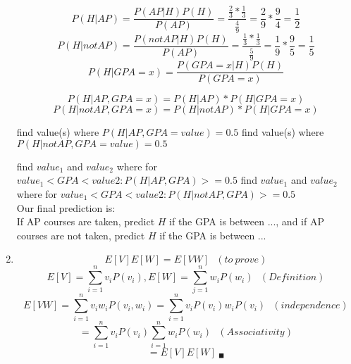 \documentclass{article}
\begin{document}
\begin{enumerate}
            $$ P(H | AP) = \frac{P(AP | H) P(H)}{P(AP)} =
                \frac{\frac{2}{3} * \frac{1}{3}}{\frac{4}{9}} = \frac{2}{9} * \frac{9}{4} = \frac{1}{2}$$
            $$ P(H | not AP) = \frac{P(not AP | H) P(H)}{P(AP)} =
            \frac{\frac{1}{3} * \frac{1}{3}}{\frac{5}{9}} = \frac{1}{9} * \frac{9}{5} = \frac{1}{5}$$
            $$ P(H | GPA = x) = \frac{P(GPA = x | H) P(H) }{P(GPA = x)} $$

            $$ P(H | AP, GPA = x) = P(H | AP) * P(H | GPA = x) $$
            $$ P(H | not AP, GPA = x) = P(H | not AP) * P(H | GPA = x) $$

            find value(s) where $P(H | AP, GPA = value) = 0.5 $
            find value(s) where $P(H | not AP, GPA = value) = 0.5 $

            find $value_1$ and $value_2$ where for $value_1 < GPA < value 2: P(H | AP, GPA) >= 0.5 $
            find $value_1$ and $value_2$ where for $value_1 < GPA < value 2: P(H | not AP, GPA) >= 0.5 $  \\
            Our final prediction is: \\
            If AP courses are taken, predict $H$ if the GPA is between ..., and
            if AP courses are not taken, predict $H$ if the GPA is between ... \\
        \item
            $$ E[V]E[W] = E[VW] \ \ \ (to\ prove)$$
            $$ E[V] = \sum_{i = 1}^{n} v_i P(v_i), E[W] = \sum_{j = 1}^{n} w_i P(w_i) \ \ \ (Definition)$$
            $$ E[VW] = \sum_{i = 1}^{n} v_iw_iP(v_i, w_i) = \sum_{i = 1}^{n} v_iP(v_i)w_iP(v_i) \ \ \ (independence)$$
            $$ = \sum_{i = 1}^{n} v_i P(v_i) \sum_{i = 1}^{n} w_i P(w_i) \ \ \ (Associativity)$$
            $$ = E[V]E[W]\ _\blacksquare$$
\end{enumerate}
\end{document}
